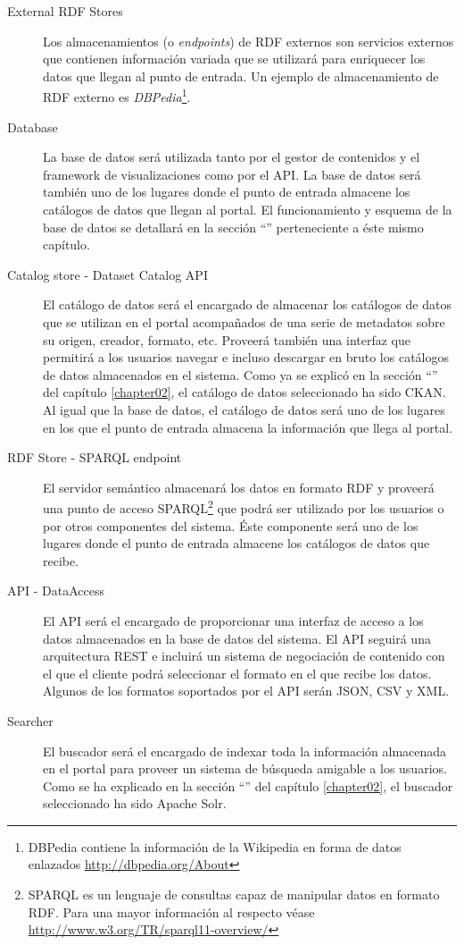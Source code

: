 \begin{description}
	\item[External RDF Stores]  Los almacenamientos (o \textit{endpoints}) de RDF externos son servicios externos que contienen información variada que se utilizará para enriquecer los datos que llegan al punto de entrada.  Un ejemplo de almacenamiento de RDF externo es \textit{DBPedia}\footnote{DBPedia contiene la información de la Wikipedia en forma de datos enlazados \url{http://dbpedia.org/About}}.
	\item[Database]  La base de datos será utilizada tanto por el gestor de contenidos y el framework de visualizaciones como por el API.  La base de datos será también uno de los lugares donde el punto de entrada almacene los catálogos de datos que llegan al portal.  El funcionamiento y esquema de la base de datos se detallará en la sección ``'' perteneciente a éste mismo capítulo.
	\item[Catalog store - Dataset Catalog API]  El catálogo de datos será el encargado de almacenar los catálogos de datos que se utilizan en el portal acompañados de una serie de metadatos sobre su origen, creador, formato, etc.  Proveerá también una interfaz que permitirá a los usuarios navegar e incluso descargar en bruto los catálogos de datos almacenados en el sistema.  Como ya se explicó en la sección ``'' del capítulo \ref{chapter02}, el catálogo de datos seleccionado ha sido CKAN.  Al igual que la base de datos, el catálogo de datos será uno de los lugares en los que el punto de entrada almacena la información que llega al portal.
	\item[RDF Store - SPARQL endpoint]  El servidor semántico almacenará los datos en formato RDF y proveerá una punto de acceso SPARQL\footnote{SPARQL es un lenguaje de consultas capaz de manipular datos en formato RDF.  Para una mayor información al respecto véase \url{http://www.w3.org/TR/sparql11-overview/}} que podrá ser utilizado por los usuarios o por otros componentes del sistema.  Éste componente será uno de los lugares donde el punto de entrada almacene los catálogos de datos que recibe.
	\item[API - DataAccess]  El API será el encargado de proporcionar una interfaz de acceso a los datos almacenados en la base de datos del sistema.  El API seguirá una arquitectura REST e incluirá un sistema de negociación de contenido con el que el cliente podrá seleccionar el formato en el que recibe los datos.  Algunos de los formatos soportados por el API serán JSON, CSV y XML.
	\item[Searcher]  El buscador será el encargado de indexar toda la información almacenada en el portal para proveer un sistema de búsqueda amigable a los usuarios.  Como se ha explicado en la sección ``'' del capítulo \ref{chapter02}, el buscador seleccionado ha sido Apache Solr.

\end{description}
